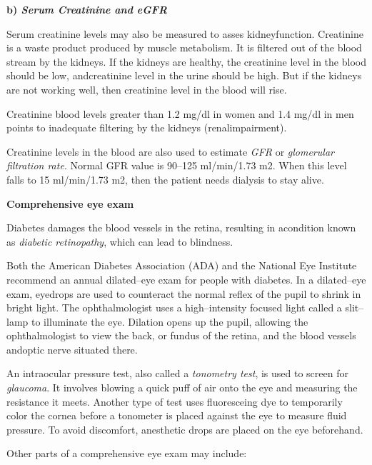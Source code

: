 \clearpage

\textbf{b) \textit{Serum Creatinine and eGFR}}

Serum creatinine levels may also be measured to asses kidney\break function. Creatinine is a waste product produced by muscle meta\-bo\-lism. It is filtered out of the blood stream by the kidneys. If the kidneys are healthy, the creatinine level in the blood should be low, and\break creatinine level in the urine should be high. But if the kidneys are not working well, then creatinine level in the blood will rise.

Creatinine blood levels greater than 1.2 mg/dl in women and 1.4 mg/dl in men points to inadequate filtering by the kidneys (renal\break impairment).

Creatinine levels in the blood are also used to estimate \textit{GFR} or \textit{glome\-rular filtration rate}. Normal GFR value is 90–125 ml/min/1.73 m2. When this level falls to 15 ml/min/1.73 m2, then the patient needs dialysis to stay alive.

\noindent\textbf{Comprehensive eye exam}

Diabetes damages the blood vessels in the retina, resulting in a\break condition known as \textit{diabetic retinopathy}, which can lead to blindness.

Both the American Diabetes Association (ADA) and the National Eye Institute recommend an annual dilated–eye exam for people with diabetes. In a dilated–eye exam, eyedrops are used to counteract the normal reflex of the pupil to shrink in bright light. The ophthalmo\-logist uses a high–intensity focused light called a slit–lamp to illuminate the eye. Dilation opens up the pupil, allowing the ophthalmo\-logist to view the back, or fundus of the retina, and the blood vessels and\break optic nerve situated there.

An intraocular pressure test, also called a \textit{tonometry test}, is used to screen for \textit{glaucoma}. It involves blowing a quick puff of air onto the eye and measuring the resistance it meets. Another type of test uses fluoresceing dye to temporarily color the cornea before a tonometer is placed against the eye to measure fluid pressure. To avoid discomfort, anesthetic drops are placed on the eye beforehand.

\noindent Other parts of a comprehensive eye exam may include:

